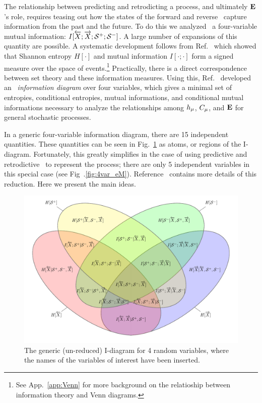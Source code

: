 The relationship between predicting and retrodicting a process, and ultimately
${\bf E}$'s role, requires teasing out how the states of the forward and reverse
\eMs\ capture information from the past and the future. To do this we
analyzed~\cite{Crut08c} a four-variable mutual information:
$I[\smash{\overleftarrow {{X}}};\smash{\overrightarrow{{X}}};{\mathcal{S}}^{+};{\mathcal{S}}^{-}]$.
A large number of expansions of this quantity are possible. A systematic
development follows from Ref.~\cite{Yeun91a} which showed that Shannon entropy
$H[\cdot]$ and mutual information $I[\cdot;\cdot]$ form a signed measure over
the space of events.\footnote{See App.~\ref{app:Venn} for more background on the relatioship between information theory and Venn diagrams.} Practically, there is a direct correspondence between set
theory and these information measures. Using this, Ref.~\cite{Crut08c} developed
an \emph{\eM\ information diagram} over four variables, which gives a minimal
set of entropies, conditional entropies, mutual informations, and conditional
mutual informations necessary to analyze the relationships among $h_\mu$,
$C_\mu$, and ${\bf E}$ for general stochastic processes.

In a generic four-variable information diagram, there are 15 independent
quantities. These quantities can be seen in Fig.~\ref{fig:4variable} as atoms, or regions of the I-diagram. Fortunately, this greatly simplifies in the case of using predictive and retrodictive \eMs\ to represent the process; there are only 5 independent variables in this special case (see Fig~.\ref{fig:4var_eM}). 
Reference~\cite{Crut08a} contains more details of this reduction. Here we present the main ideas.

\begin{figure}[h]
\centering
\includegraphics[scale=0.8]{../chapter2/figures/tikz/4var_labels}
\caption{The generic (un-reduced) I-diagram for 4 random variables, where the names of the variables of interest have been inserted.}
\label{fig:4variable}
\end{figure}

